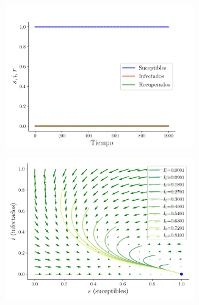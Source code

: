 \documentclass[twocolumn,aps,prl]{revtex4-1}
\begin{document}
\begin{figure}[ht!]
  \begin{subfigure}[b]{0.49\linewidth}
      \centering
      \includegraphics[width = 0.9\textwidth]{figuras/ex01-c-sir.pdf}
      \caption{}
      \label{fig:figuras/ex01-c-sir}
  \end{subfigure}\quad
  \begin{subfigure}[b]{0.49\linewidth}
      \centering
      \includegraphics[width = 0.9\textwidth]{figuras/ex01-c-vector.pdf}
      \caption{}
      \label{fig:figuras/ex01-c-vector}
  \end{subfigure}\quad
  \caption{}
\end{figure}

\end{document}
